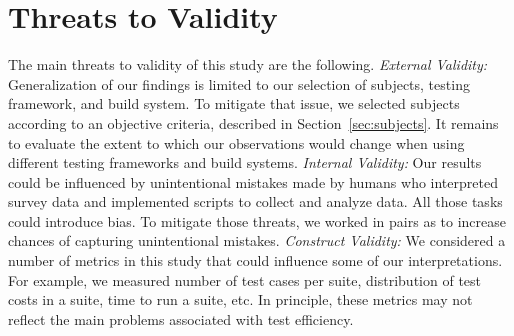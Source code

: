 \section{Threats to Validity}

The main threats to validity of this study are the following.
\textit{External Validity:} Generalization of our findings is limited
to our selection of subjects, testing framework, and build system.  To
mitigate that issue, we selected subjects according to an objective
criteria, described in Section~\ref{sec:subjects}.  It remains to
evaluate the extent to which our observations would change when using
different testing frameworks and build systems.  \textit{Internal
  Validity:} Our results could be influenced by unintentional mistakes
made by humans who interpreted survey data and implemented scripts to
collect and analyze data. All those tasks could introduce bias.  To
mitigate those threats, we worked in pairs as to increase chances of
capturing unintentional mistakes.  \textit{Construct Validity:} We
considered a number of metrics in this study that could influence some
of our interpretations.  For example, we measured number of test cases
per suite, distribution of test costs in a suite, time to run a suite,
etc.  In principle, these metrics may not reflect the main problems
associated with test efficiency.


